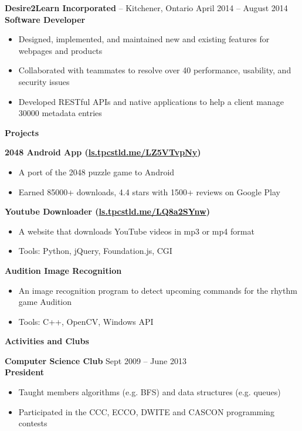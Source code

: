 \documentclass{letter}
\begin{document}
\vspace{-1.5mm}
{\bfseries Desire2Learn Incorporated} -- Kitchener, Ontario \hfill April 2014 -- August 2014 \\
{\bfseries Software Developer}
\vspace{-3mm}
\begin{itemize}
    \item Designed, implemented, and maintained new and existing features for webpages and products
    \item Collaborated with teammates to resolve over 40 performance, usability, and security issues
    \item Developed RESTful APIs and native applications to help a client manage 30000 metadata entries
\end{itemize}

{\bfseries \Large Projects}

\vspace{-1.5mm}
{\bfseries 2048 Android App (\href{http://ls.tpcstld.me/LZ5YTvpNy}{ls.tpcstld.me/LZ5VTvpNy})}
\vspace{-3mm}
\begin{itemize}
    \item A port of the 2048 puzzle game to Android
    \item Earned 85000+ downloads, 4.4 stars with 1500+ reviews on Google Play
\end{itemize}
\vspace{-3mm}
{\bfseries Youtube Downloader (\href{http://ls.tpcstld.me/LQ8a2SYnw}{ls.tpcstld.me/LQ8a2SYnw})}
\vspace{-3mm}
\begin{itemize}
    \item A website that downloads YouTube videos in mp3 or mp4 format
    \item Tools: Python, jQuery, Foundation.js, CGI
\end{itemize}
\vspace{-3mm}
{\bfseries Audition Image Recognition}
\vspace{-3mm}
\begin{itemize}
    \item An image recognition program to detect upcoming commands for the rhythm game Audition
    \item Tools: C++, OpenCV, Windows API
\end{itemize}

{\bfseries \Large Activities and Clubs}

\vspace{-1.5mm}
{\bfseries Computer Science Club} \hfill Sept 2009 -- June 2013 \\
{\bfseries President}
\vspace{-3mm}
\begin{itemize}
  \item Taught members algorithms (e.g. BFS) and data structures (e.g. queues)
  \item Participated in the CCC, ECCO, DWITE and CASCON programming contests
\end{itemize}
\end{document}
